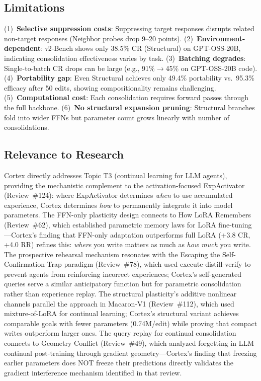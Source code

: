 \documentclass[11pt,a4paper]{article}
\begin{document}
\subsection{Limitations}
(1)~\textbf{Selective suppression costs}: Suppressing target responses disrupts related non-target responses (Neighbor probes drop 9--20 points). (2)~\textbf{Environment-dependent}: $\tau$2-Bench shows only 38.5\% CR (Structural) on GPT-OSS-20B, indicating consolidation effectiveness varies by task. (3)~\textbf{Batching degrades}: Single-to-batch CR drops can be large (e.g., 91\%$\to$45\% on GPT-OSS-20B code). (4)~\textbf{Portability gap}: Even Structural achieves only 49.4\% portability vs.\ 95.3\% efficacy after 50 edits, showing compositionality remains challenging. (5)~\textbf{Computational cost}: Each consolidation requires forward passes through the full backbone. (6)~\textbf{No structural expansion pruning}: Structural branches fold into wider FFNs but parameter count grows linearly with number of consolidations.

\subsection{Relevance to Research}
Cortex directly addresses Topic T3 (continual learning for LLM agents), providing the mechanistic complement to the activation-focused ExpActivator (Review~\#124): where ExpActivator determines \emph{when} to use accumulated experience, Cortex determines \emph{how} to permanently integrate it into model parameters. The FFN-only plasticity design connects to How LoRA Remembers (Review~\#62), which established parametric memory laws for LoRA fine-tuning---Cortex's finding that FFN-only adaptation outperforms full LoRA (+3.8 CR, +4.0 RR) refines this: \emph{where} you write matters as much as \emph{how much} you write. The prospective rehearsal mechanism resonates with the Escaping the Self-Confirmation Trap paradigm (Review~\#78), which used execute-distill-verify to prevent agents from reinforcing incorrect experiences; Cortex's self-generated queries serve a similar anticipatory function but for parametric consolidation rather than experience replay. The structural plasticity's additive nonlinear channels parallel the approach in Macaron-V1 (Review~\#112), which used mixture-of-LoRA for continual learning; Cortex's structural variant achieves comparable goals with fewer parameters (0.74M/edit) while proving that compact writes outperform larger ones. The query replay for continual consolidation connects to Geometry Conflict (Review~\#49), which analyzed forgetting in LLM continual post-training through gradient geometry---Cortex's finding that freezing earlier parameters does NOT freeze their predictions directly validates the gradient interference mechanism identified in that review.
\end{document}
